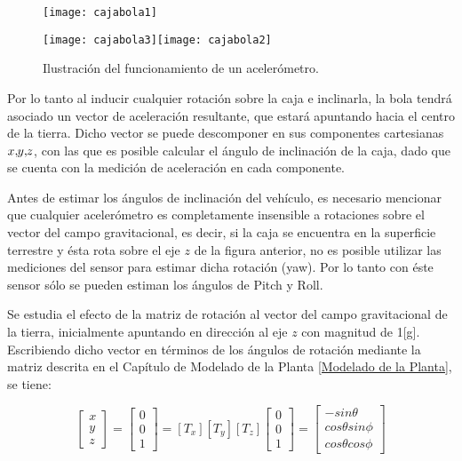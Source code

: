 \documentclass[../main.tex]{subfiles}
\begin{document}
\begin{figure}[H]
\noindent \begin{centering}
\texttt{[image: cajabola1]}
\par\end{centering}
\noindent \begin{centering}
\texttt{[image: cajabola3]}\texttt{[image: cajabola2]}
\par\end{centering}
\caption{Ilustración del funcionamiento de un acelerómetro.}
\end{figure}

Por lo tanto al inducir cualquier rotación sobre la caja e inclinarla,
la bola tendrá asociado un vector de aceleración resultante, que estará
apuntando hacia el centro de la tierra. Dicho vector se puede descomponer
en sus componentes cartesianas $x,\negmedspace y,\negmedspace z$,
con las que es posible calcular el ángulo de inclinación de la caja,
dado que se cuenta con la medición de aceleración en cada componente. 

Antes de estimar los ángulos de inclinación del vehículo, es necesario
mencionar que cualquier acelerómetro es completamente insensible a
rotaciones sobre el vector del campo gravitacional, es decir, si la
caja se encuentra en la superficie terrestre y ésta rota sobre el
eje $z$ de la figura anterior, no es posible utilizar las mediciones
del sensor para estimar dicha rotación (yaw). Por lo tanto con éste sensor sólo
se pueden estiman los ángulos de Pitch y Roll.

Se estudia el efecto de la matriz de rotación al vector del campo
gravitacional de la tierra, inicialmente apuntando en dirección al
eje $z$ con magnitud de 1{[}g{]}. Escribiendo dicho vector en términos
de los ángulos de rotación mediante la matriz descrita en el Capítulo
de Modelado de la Planta \ref{Modelado de la Planta}, se tiene:


\begin{equation}
\left[\begin{array}{c}
x\\
y\\
z
\end{array}\right]=\left[\begin{array}{c}
0\\
0\\
1
\end{array}\right]=[T_{x}][T_{y}][T_{z}]\left[\begin{array}{c}
0\\
0\\
1
\end{array}\right]=\left[\begin{array}{c}
-sin\theta\\
cos\theta sin\phi\\
cos\theta cos\phi
\end{array}\right]\label{eq:rotacion a gravitacional}
\end{equation}
\end{document}
